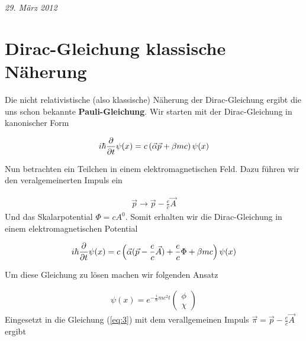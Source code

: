 
\usepackage{amsmath} 





\textit{29. März 2012}


\section*{Dirac-Gleichung klassische Näherung}

Die nicht relativistische (also klassische) Näherung der Dirac-Gleichung ergibt die uns schon bekannte \textbf{Pauli-Gleichung}. Wir starten mit der Dirac-Gleichung in kanonischer Form

\begin{align}
  \label{eq:1}
  i\hbar\pdiff_t \psi(x) = c\left(\vec \alpha \vec p +\beta mc  \right)\psi(x)
\end{align}

Nun betrachten ein Teilchen in einem elektromagnetischen Feld. Dazu führen wir den veralgemeinerten Impuls ein

\begin{align}
  \label{eq:2}
  \vec p \rightarrow \vec p - \frac{e}{c}\vec A
\end{align}
Und das Skalarpotential \(\Phi=cA^{0}\). Somit erhalten wir die Dirac-Gleichung in einem elektromagnetischen Potential

\begin{align}
  \label{eq:3}
  i\hbar\pdiff_t \psi(x) = c\left(\vec \alpha (\vec p - \frac{e}{c}\vec A) + \frac{e}{c}\Phi   +\beta mc  \right)\psi(x)
\end{align}

Um diese Gleichung zu lösen machen wir folgenden Ansatz

\begin{align}
  \label{eq:4}
  \psi(x) = e^{-\frac{i}{\hbar}mc^2 t} \begin{pmatrix}  \phi\\\chi \end{pmatrix}
\end{align}
Eingesetzt in die Gleichung (\ref{eq:3}) mit dem verallgemeinen Impuls \(\vec\pi = \vec p - \frac{e}{c}\vec A \) ergibt

